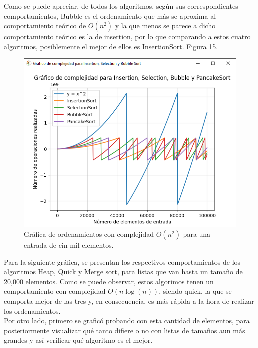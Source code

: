 \documentclass[a4paper,12pt]{article}
\begin{document}
Como se puede apreciar, de todos los algoritmos, según sus correspondientes comportamientos, Bubble es el ordenamiento que más se aproxima al comportamiento teórico de $O(n^2)$ y la que menos se parece a dicho comportamiento teórico es la de insertion, por lo que comparando a estos cuatro algoritmos, posiblemente el mejor de ellos es InsertionSort. Figura 15.

\begin{figure}[h]
    \centering
    \includegraphics[width=1\textwidth]{media/graficaA_100k.png}
    \caption{Gráfica de ordenamientos con complejidad $O(n^2)$ para una entrada de cin mil elementos.}
    \label{fig:grafA_100k}
\end{figure}

Para la siguiente gráfica, se presentan los respectivos comportamientos de los algoritmos Heap, Quick y Merge sort, para listas que van hasta un tamaño de 20,000 elementos. Como se puede observar, estos algorimos tenen un comportamiento con complejidad $O(n\log(n))$, siendo quick, la que se comporta mejor de las tres y, en consecuencia, es más rápida a la hora de realizar los ordenamientos.\\
Por otro lado, primero se graficó probando con esta cantidad de elementos, para posteriormente visualizar qué tanto difiere o no con listas de tamaños aun más grandes y así verificar qué algoritmo es el mejor.
\end{document}
